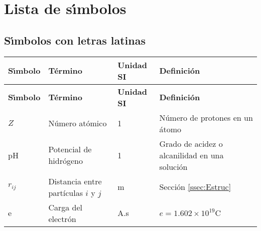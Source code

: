 \chapter*{Lista de s\'{\i}mbolos}
\section*{S\'{\i}mbolos con letras latinas}
 \label{simbolos}
\begin{longtable}{p{2cm}p{3.5cm}p{2cm}p{8cm}}
\textbf{S\'{\i}mbolo}&\textbf{T\'{e}rmino}&\textbf{Unidad SI}&\textbf{Definici\'{o}n}\\[0.5ex]\hline
\endfirsthead%
\textbf{S\'{\i}mbolo}&\textbf{T\'{e}rmino}&\textbf{Unidad SI}&\textbf{Definici\'{o}n}\\[0.5ex]\hline
\endhead%
      $Z$&N\'{u}mero at\'{o}mico&1&N\'{u}mero de protones en un \'{a}tomo\\%
      pH &Potencial de hidr\'{o}geno &1        &Grado de acidez o alcanilidad en una soluci\'{o}n\\%
      $r_{ij}$&Distancia entre part\'{i}culas $i$ y $j$&m&Secci\'{o}n \ref{ssec:Estruc}\\%
      e&Carga del electr\'{o}n&A.s&$e=1.602\times 10^{19}$C\\%

\end{longtable}
